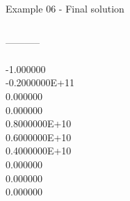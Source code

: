 \begin{frame}{Example 06 - Final solution}
\begin{columns}[t]
\begin{column}{0.3\textwidth}
-----------\\
\\
-1.000000\\
-0.2000000E+11\\
0.000000\\
0.000000\\
0.8000000E+10\\
0.6000000E+10\\
0.4000000E+10\\
0.000000\\
0.000000\\
0.000000\\                              
\end{column}
\end{columns}  


\end{frame}

